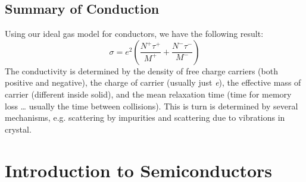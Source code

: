 \subsection{Summary of Conduction}
Using our ideal gas model for conductors, we have the following result:
\begin{equation}
        \sigma  = {e^2}\left( {\frac{{{N^ + }{\tau ^ + }}}{{{M^ + }}} + \frac{{{N^ - }{\tau ^ - }}}{{{M^ - }}}} \right)
\end{equation}
The conductivity is determined by the density of free charge carriers (both positive and negative), the charge of carrier (usually just \textit{e}), the effective mass of carrier (different inside solid), and the mean relaxation time (time for memory loss … usually the time between collisions).   This is turn is determined by several mechanisms, e.g. scattering by impurities and scattering due to vibrations in crystal.
\section{Introduction to Semiconductors}
